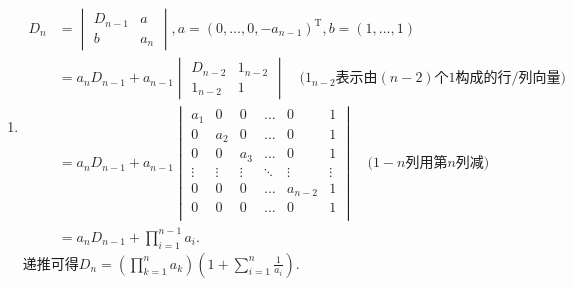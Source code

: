 \documentclass[UTF8,12pt,a4paper,fontset=fandol]{ctexart}
\begin{document}
\begin{solve}
\begin{enumerate}
                \item \begin{align*}
                          D_n & =\begin{vmatrix}
                                     D_{n-1} & a   \\
                                     b       & a_n
                                 \end{vmatrix},a=(0, \ldots, 0, -a_{n-1})^\mathrm{T}, b=(1, \ldots, 1) \\
                              & =a_nD_{n-1}+a_{n-1}\begin{vmatrix}
                                                       D_{n-2} & 1_{n-2} \\
                                                       1_{n-2} & 1
                                                   \end{vmatrix}
                          \quad \text{($1_{n-2}$表示由$(n-2)$个1构成的行/列向量)}                      \\
                              & =a_nD_{n-1}+a_{n-1}
                          \begin{vmatrix}
                              a_1    & 0      & 0      & \ldots & 0       & 1      \\
                              0      & a_2    & 0      & \ldots & 0       & 1      \\
                              0      & 0      & a_3    & \ldots & 0       & 1      \\
                              \vdots & \vdots & \vdots & \ddots & \vdots  & \vdots \\
                              0      & 0      & 0      & \ldots & a_{n-2} & 1      \\
                              0      & 0      & 0      & \ldots & 0       & 1      \\
                          \end{vmatrix} \quad \text{($1-n$列用第$n$列减)}                         \\
                              & =a_nD_{n-1}+\prod_{i=1}^{n-1}a_i.
                      \end{align*}
                      递推可得$\displaystyle D_n=\left(\prod_{k=1}^na_k\right)
                          \left(1+\sum_{i=1}^n\frac{1}{a_i}\right)$.


\end{enumerate}
\end{solve}
\end{document}
